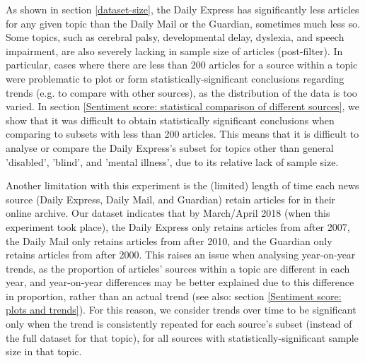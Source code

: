 \documentclass{report}
\newcommand{\textapprox}{\raisebox{0.5ex}{\texttildelow}}  %
\begin{document}
As shown in section \ref{dataset-size}, the Daily Express has significantly less articles for any given topic than the Daily Mail or the Guardian, sometimes much less so.
Some topics, such as cerebral palsy, developmental delay, dyslexia, and speech impairment, are also severely lacking in sample size of articles (post-filter).
In particular, cases where there are less than \textapprox200 articles for a source within a topic were problematic to plot or form statistically-significant conclusions regarding trends (e.g. to compare with other sources), as the distribution of the data is too varied. %
In section \ref{Sentiment score: statistical comparison of different sources}, we show that it was difficult to obtain statistically significant conclusions when comparing to subsets with less than \textapprox200 articles.
This means that it is difficult to analyse or compare the Daily Express's subset for topics other than general 'disabled', 'blind', and 'mental illness', due to its relative lack of sample size.

Another limitation with this experiment is the (limited) length of time each news source (Daily Express, Daily Mail, and Guardian) retain articles for in their online archive.
Our dataset indicates that by March/April 2018 (when this experiment took place), the Daily Express only retains articles from after \textapprox2007, the Daily Mail only retains articles from after \textapprox2010, and the Guardian only retains articles from after \textapprox2000. 
This raises an issue when analysing year-on-year trends, as the proportion of articles' sources within a topic are different in each year, and year-on-year differences may be better explained due to this difference in proportion, rather than an actual trend (see also: section \ref{Sentiment score: plots and trends}).
For this reason, we consider trends over time to be significant only when the trend is consistently repeated for each source's subset (instead of the full dataset for that topic), for all sources with statistically-significant sample size in that topic. 
\end{document}
